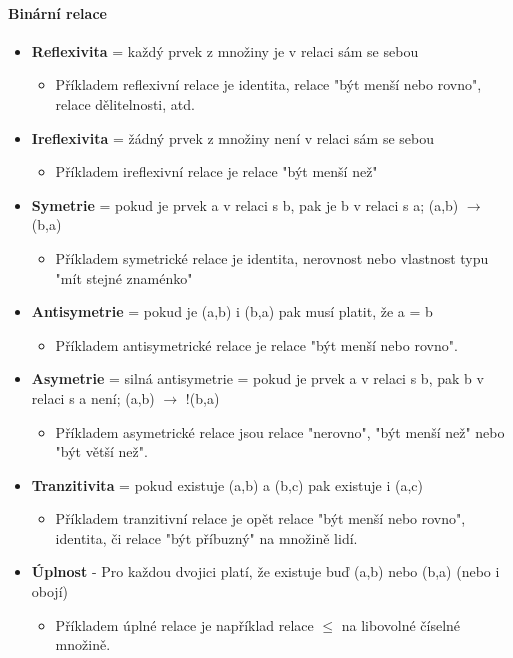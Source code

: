 \documentclass[10pt,a4paper]{article}
\begin{document}
\paragraph{Binární relace}
\begin{itemize}
\item \textbf{Reflexivita} = každý prvek z množiny je v relaci sám se sebou
\begin{itemize}
\item Příkladem reflexivní relace je identita, relace "být menší nebo rovno", relace dělitelnosti, atd.
\end{itemize}
\item \textbf{Ireflexivita} = žádný prvek z množiny není v relaci sám se sebou
\begin{itemize}
\item Příkladem ireflexivní relace je relace "být menší než"
\end{itemize}
\item \textbf{Symetrie} = pokud je prvek a v relaci s b, pak je b v relaci s a; (a,b) $\rightarrow$ (b,a)
\begin{itemize}
\item Příkladem symetrické relace je identita, nerovnost nebo vlastnost typu "mít stejné znaménko"
\end{itemize}
\item \textbf{Antisymetrie} = pokud je (a,b) i (b,a) pak musí platit, že a = b
\begin{itemize}
\item Příkladem antisymetrické relace je relace "být menší nebo rovno".
\end{itemize}
\item \textbf{Asymetrie} = silná antisymetrie = pokud je prvek a v relaci s b, pak b v relaci s a není; (a,b) $\rightarrow$ !(b,a)
\begin{itemize}
\item Příkladem asymetrické relace jsou relace "nerovno", "být menší než" nebo "být větší než".
\end{itemize}
\item \textbf{Tranzitivita} = pokud existuje (a,b) a (b,c) pak existuje i (a,c)
\begin{itemize}
\item Příkladem tranzitivní relace je opět relace "být menší nebo rovno", identita, či relace "být příbuzný" na množině lidí.
\end{itemize}
\item \textbf{Úplnost} - Pro každou dvojici platí, že existuje buď (a,b) nebo (b,a) (nebo i obojí)
\begin{itemize} 
\item Příkladem úplné relace je například relace $\leq$ na libovolné číselné  množině.
\end{itemize}
\end{itemize}
\end{document}
